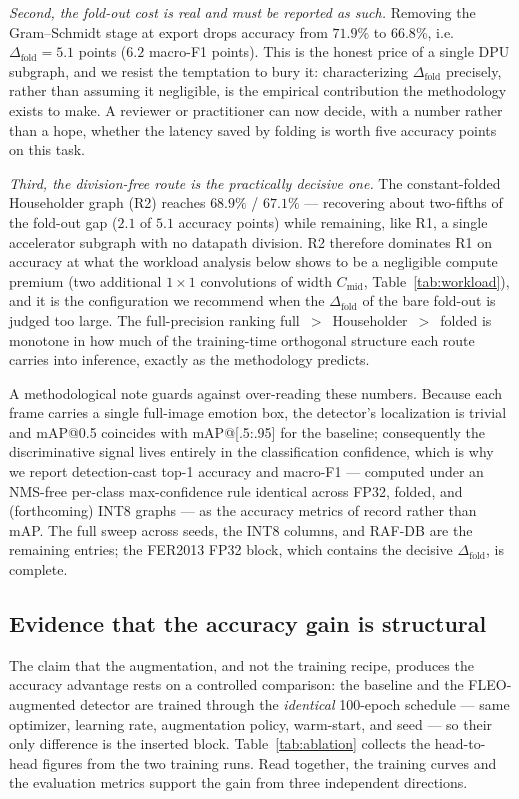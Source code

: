 \documentclass[onecolumn,journal]{IEEEtran}
\begin{document}
\emph{Second, the fold-out cost is real and must be reported as such.} Removing the
Gram--Schmidt stage at export drops accuracy from $71.9\%$ to $66.8\%$, i.e.\
$\Delta_{\mathrm{fold}}=5.1$ points ($6.2$ macro-F1 points). This is the honest price
of a single DPU subgraph, and we resist the temptation to bury it: characterizing
$\Delta_{\mathrm{fold}}$ precisely, rather than assuming it negligible, is the empirical
contribution the methodology exists to make. A reviewer or practitioner can now decide,
with a number rather than a hope, whether the latency saved by folding is worth five
accuracy points on this task.

\emph{Third, the division-free route is the practically decisive one.} The
constant-folded Householder graph (R2) reaches $68.9\%$ / $67.1\%$ --- recovering
about two-fifths of the fold-out gap ($2.1$ of $5.1$ accuracy points) while remaining,
like R1, a single accelerator subgraph with no datapath division. R2 therefore
dominates R1 on accuracy at what the workload analysis below shows to be a negligible
compute premium (two additional $1{\times}1$ convolutions of width $C_{\mathrm{mid}}$,
Table~\ref{tab:workload}), and it is the configuration we recommend when the
$\Delta_{\mathrm{fold}}$ of the bare fold-out is judged too large. The full-precision
ranking full~$>$~Householder~$>$~folded is monotone in how much of the training-time
orthogonal structure each route carries into inference, exactly as the methodology
predicts.

A methodological note guards against over-reading these numbers. Because each frame
carries a single full-image emotion box, the detector's localization is trivial and
mAP@0.5 coincides with mAP@[.5:.95] for the baseline; consequently the discriminative
signal lives entirely in the classification confidence, which is why we report
detection-cast top-1 accuracy and macro-F1 --- computed under an NMS-free per-class
max-confidence rule identical across FP32, folded, and (forthcoming) INT8 graphs --- as
the accuracy metrics of record rather than mAP. The full sweep across
seeds, the INT8 columns, and RAF-DB are the remaining entries; the FER2013 FP32 block,
which contains the decisive $\Delta_{\mathrm{fold}}$, is complete.

\subsection{Evidence that the accuracy gain is structural}\label{sec:evidence}
The claim that the augmentation, and not the training recipe, produces the accuracy
advantage rests on a controlled comparison: the baseline and the FLEO-augmented detector
are trained through the \emph{identical} 100-epoch schedule --- same optimizer, learning
rate, augmentation policy, warm-start, and seed --- so their only difference is the
inserted block. Table~\ref{tab:ablation} collects the head-to-head figures from the two
training runs. Read together, the training curves and the evaluation metrics support the
gain from three independent directions.
\end{document}
